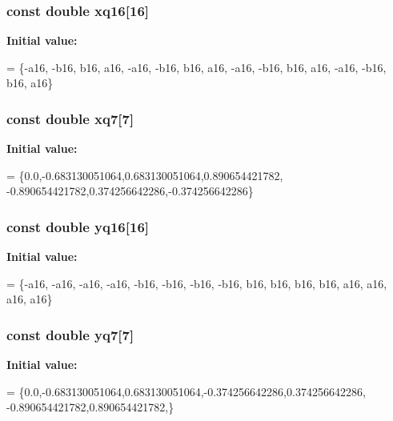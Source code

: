 \subsubsection[{xq16}]{\setlength{\rightskip}{0pt plus 5cm}const double xq16[16]}\label{GaussQuadratureQuad_8cc_a01e790583b20ceef4a6696e950524386}
{\bfseries Initial value\-:}
\begin{DoxyCode}
= \{-a16, -b16, b16, a16, -a16, -b16, b16, a16,  
                   -a16, -b16, b16, a16, -a16, -b16, b16, a16\}
\end{DoxyCode}
\subsubsection[{xq7}]{\setlength{\rightskip}{0pt plus 5cm}const double xq7[7]}\label{GaussQuadratureQuad_8cc_a9b4a8348a860d2e93874944d660b4e2d}
{\bfseries Initial value\-:}
\begin{DoxyCode}
= \{0.0,-0.683130051064,0.683130051064,0.890654421782,
                       -0.890654421782,0.374256642286,-0.374256642286\}
\end{DoxyCode}
\subsubsection[{yq16}]{\setlength{\rightskip}{0pt plus 5cm}const double yq16[16]}\label{GaussQuadratureQuad_8cc_a55b461d8cbdcc03b5a9a47927c5e28d9}
{\bfseries Initial value\-:}
\begin{DoxyCode}
= \{-a16, -a16, -a16, -a16, -b16, -b16, -b16, -b16,
                         b16, b16, b16, b16, a16, a16, a16, a16\}
\end{DoxyCode}
\subsubsection[{yq7}]{\setlength{\rightskip}{0pt plus 5cm}const double yq7[7]}\label{GaussQuadratureQuad_8cc_a0cea94e94830c1098b554d9fa5be8fef}
{\bfseries Initial value\-:}
\begin{DoxyCode}
= \{0.0,-0.683130051064,0.683130051064,-0.374256642286,0.374256642286,
                       -0.890654421782,0.890654421782,\}
\end{DoxyCode}
